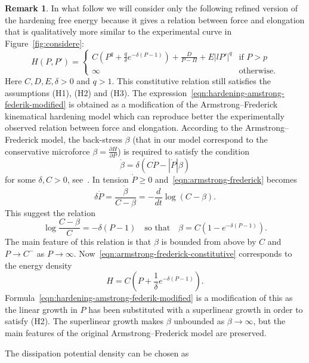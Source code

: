\documentclass[a4paper,10pt,twoside]{amsbook}
\numberwithin{section}{chapter}
\numberwithin{equation}{chapter}
\theoremstyle{definition}
\newtheorem{rmk}[prop]{Remark}
\newcommand{\dind}[2]{\frac{\partial #1}{\partial #2}}
\begin{document}
\begin{rmk}
\label{rmk:am-fed}
In what follow we will consider only the following refined version of the hardening free energy because it gives a relation between force and elongation that is qualitatively more similar to the experimental curve in Figure~\ref{fig:considere}:
\begin{equation}
\label{eqn:hardening-amstrong-federik-modified}
H(P,P')=
\begin{cases}
C\left(P^q+\frac{q}{\delta}e^{-\delta(P-1)}\right)+\frac{D}{P-\Pi}+E|lP'|^q & \text{if $P>p$} \\
\infty & \text{otherwise}.
\end{cases}
\end{equation}
Here $C,D,E,\delta>0$ and $q>1$. This constitutive relation still satisfies the assumptions (H1), (H2) and (H3). The expression~\eqref{eqn:hardening-amstrong-federik-modified} is obtained as a modification of the Armstrong--Frederick kinematical hardening model which can reproduce better the experimentally observed relation between force and elongation. According to the Armstrong--Frederick model, the back-stress $\beta$ (that in our model correspond to the conservative microforce $\beta=\dind{H}{P}$) is required to satisfy the condition
\begin{equation}
\label{eqn:armstrong-frederick}
\dot\beta=\delta(C\dot P-|\dot P|\beta)
\end{equation}
for some $\delta,C>0$, see~\cite{steffranc}. In tension $\dot P\ge0$ and~\eqref{eqn:armstrong-frederick} becomes
\[
\delta\dot P=\frac{\dot\beta}{C-\beta}=-\frac{d}{dt}\log(C-\beta).
\]
This suggest the relation
\begin{equation}
\label{eqn:armstrong-frederick-constitutive}
\log\frac{C-\beta}{C}=-\delta(P-1)\quad\text{so that}\quad\beta=C(1-e^{-\delta(P-1)}).
\end{equation}
The main feature of this relation is that $\beta$ is bounded from above by $C$ and $P\to C^-$ as $P\to\infty$. Now~\eqref{eqn:armstrong-frederick-constitutive} corresponds to the energy density
\[
H=C\left(P+\frac{1}{\delta}e^{-\delta(P-1)}\right).
\]
Formula~\eqref{eqn:hardening-amstrong-federik-modified} is a modification of this as the linear growth in $P$ has been substituted with a superlinear growth in order to satisfy (H2). The superlinear growth makes $\beta$ unbounded as $\beta\to\infty$, but the main features of the original Armstrong--Frederick model are preserved.
\end{rmk}
The dissipation potential density can be chosen as
\end{document}

